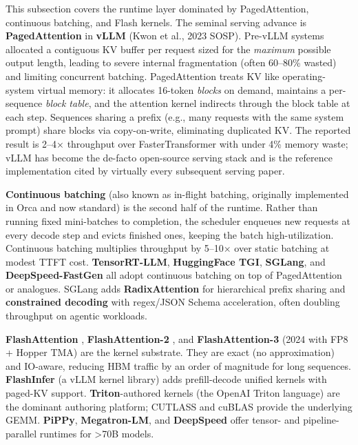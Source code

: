 \documentclass{article}
\begin{document}
This subsection covers the runtime layer dominated by PagedAttention, continuous batching, and Flash kernels. The seminal serving advance is \textbf{PagedAttention} in \textbf{vLLM} (Kwon et al., 2023 SOSP). Pre-vLLM systems allocated a contiguous KV buffer per request sized for the \emph{maximum} possible output length, leading to severe internal fragmentation (often 60--80\% wasted) and limiting concurrent batching. PagedAttention treats KV like operating-system virtual memory: it allocates 16-token \emph{blocks} on demand, maintains a per-sequence \emph{block table}, and the attention kernel indirects through the block table at each step. Sequences sharing a prefix (e.g., many requests with the same system prompt) share blocks via copy-on-write, eliminating duplicated KV. The reported result is 2--4× throughput over FasterTransformer with under 4\% memory waste; vLLM has become the de-facto open-source serving stack and is the reference implementation cited by virtually every subsequent serving paper.

\textbf{Continuous batching} (also known as in-flight batching, originally implemented in Orca and now standard) is the second half of the runtime. Rather than running fixed mini-batches to completion, the scheduler enqueues new requests at every decode step and evicts finished ones, keeping the batch high-utilization. Continuous batching multiplies throughput by 5--10× over static batching at modest TTFT cost. \textbf{TensorRT-LLM}, \textbf{HuggingFace TGI}, \textbf{SGLang}, and \textbf{DeepSpeed-FastGen} all adopt continuous batching on top of PagedAttention or analogues. SGLang adds \textbf{RadixAttention} for hierarchical prefix sharing and \textbf{constrained decoding} with regex/JSON Schema acceleration, often doubling throughput on agentic workloads.

\textbf{FlashAttention} \citep{dao20222022}, \textbf{FlashAttention-2} \citep{dao2024flashattention2fas}, and \textbf{FlashAttention-3} (2024 with FP8 + Hopper TMA) are the kernel substrate. They are exact (no approximation) and IO-aware, reducing HBM traffic by an order of magnitude for long sequences. \textbf{FlashInfer} (a vLLM kernel library) adds prefill-decode unified kernels with paged-KV support. \textbf{Triton}-authored kernels (the OpenAI Triton language) are the dominant authoring platform; CUTLASS and cuBLAS provide the underlying GEMM. \textbf{PiPPy}, \textbf{Megatron-LM}, and \textbf{DeepSpeed} offer tensor- and pipeline-parallel runtimes for \textgreater70B models.
\end{document}
